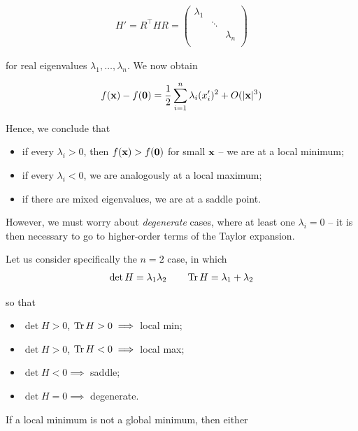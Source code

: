 \documentclass{../../template/note}
\begin{document}
    \begin{align*}
        H' = R^\intercal HR = \begin{pmatrix}
            \lambda_1 &  &  \\
             & \ddots &  \\
             & & \lambda_n \\
        \end{pmatrix}
    \end{align*}
    
    for real eigenvalues $\lambda_1, \dots, \lambda_n$. We now obtain

    \begin{align*}
        f(\V x) - f(\V 0) = \frac 1 2 \sum_{i=1}^n \lambda_i (x'_i)^2 + O(|\V x|^3)
    \end{align*}
    
    Hence, we conclude that
    \begin{itemize}
        \item if every $\lambda_i > 0$, then $f(\V x) > f(\V 0)$ for small $\V x$ -- we are at a local minimum;
        \item if every $\lambda_i < 0$, we are analogously at a local maximum;
        \item if there are mixed eigenvalues, we are at a saddle point.
    \end{itemize}
    
    However, we must worry about \emph{degenerate} cases, where at least one $\lambda_i = 0$ -- it is then necessary to go to higher-order terms of the Taylor expansion.

    Let us consider specifically the $n=2$ case, in which
    \begin{align*}
        \det H = \lambda_1 \lambda_2 \qquad \operatorname{Tr} H = \lambda_1 + \lambda_2
    \end{align*}
    
    so that
    \begin{itemize}
        \item $\det H > 0$, $\operatorname{Tr} H > 0 \implies$ local min;
        \item $\det H > 0$, $\operatorname{Tr} H < 0 \implies$ local max;
        \item $\det H < 0 \implies$ saddle;
        \item $\det H = 0 \implies$ degenerate.
    \end{itemize}
    
    If a local minimum is not a global minimum, then either
\end{document}

